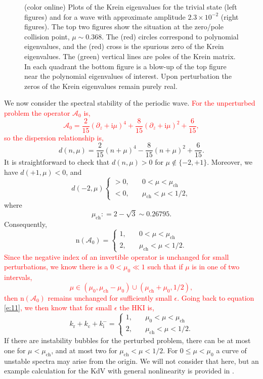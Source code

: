 \documentclass[review,onefignum,onetabnum]{siamart171218}
\def\coloneqq{\mathrel{\mathop:}=}
\newcommand{\rmc}{\mathrm{c}}
\newcommand{\rmi}{\mathrm{i}}
\newcommand{\rmn}{\mathrm{n}}
\newcommand{\rmr}{\mathrm{r}}
\newcommand{\calA}{\mathcal{A}}
\newcommand{\revised}[1]{ \textcolor{red}{#1} }
\begin{document}
\begin{figure}[ht]
\begin{center}
\begin{tabular}{cc}
\end{tabular}
\caption{(color online) Plots of the Krein eigenvalues for the trivial state (left figures) and for
a wave with approximate amplitude $2.3\times10^{-2}$ (right figures). The top two figures show the
situation at the zero/pole collision
point, $\mu\sim0.368$. The (red) circles correspond to polynomial eigenvalues, and the (red) cross
is the spurious zero of the Krein eigenvalues. The (green) vertical lines are poles
of the Krein matrix. In each quadrant the bottom figure is a blow-up
of the top figure near the polynomial eigenvalues of interest. Upon perturbation the zeros of the Krein eigenvalues remain purely real.}
\label{f:KreinEvalCollide1}
\end{center}
\end{figure}

We now consider the spectral stability of the periodic wave.
\revised{
For the unperturbed problem the operator $\calA_0$ is,
\[
\calA_0=\frac2{15}(\partial_z+\rmi\mu)^4+\frac8{15}(\partial_z+\rmi\mu)^2+\frac6{15},
\]
so the dispersion relationship is,
}
\[
d(n,\mu)=\frac2{15}(n+\mu)^4-\frac8{15}(n+\mu)^2+\frac6{15}.
\]
It is straightforward to check that $d(n,\mu)>0$ for $\mu\notin\{-2,+1\}$.
Moreover, we have $d(+1,\mu)<0$, and
\[
d(-2,\mu)\begin{cases}>0,\quad&0<\mu<\mu_{\mathrm{ch}}\\
<0,\quad&\mu_{\mathrm{ch}}<\mu<1/2,\end{cases}
\]
where
\[
\mu_{\mathrm{ch}}\coloneqq2-\sqrt{3}\sim0.26795.
\]
Consequently,
\[
\rmn(\calA_0)=\begin{cases}1,\quad&0<\mu<\mu_{\mathrm{ch}}\\
2,\quad&\mu_{\mathrm{ch}}<\mu<1/2.\end{cases}
\]
\revised{
Since the negative index of an invertible operator is unchanged for small perturbations, we know there is a $0<\mu_0\ll1$ such that if $\mu$ is in one of two intervals,
\[
\mu\in\left(\mu_0,\mu_{\mathrm{ch}}-\mu_0\right)\cup
\left(\mu_{\mathrm{ch}}+\mu_0,1/2\right),
\]
then $\rmn(\calA_0)$ remains unchanged for sufficiently small $\epsilon$. Going back to equation \cref{e:11}, we then know that for small $\epsilon$ the HKI is,
}
\[
k_\rmr+k_\rmc+k_\rmi^-=\begin{cases}1,\quad&\mu_0<\mu<\mu_{\mathrm{ch}}\\
2,\quad&\mu_{\mathrm{ch}}<\mu<1/2.\end{cases}
\]
If there are instability bubbles for the perturbed problem, there can be at most one for $\mu<\mu_{\mathrm{ch}}$, and at most two for $\mu_{\mathrm{ch}}<\mu<1/2$. For $0\le\mu<\mu_0$ a curve of unstable spectra may arise from the origin. We will not consider that here, but an example calculation for the KdV with general nonlinearity is provided in \cite[Section~4]{haragus:ots08}.
\end{document}
